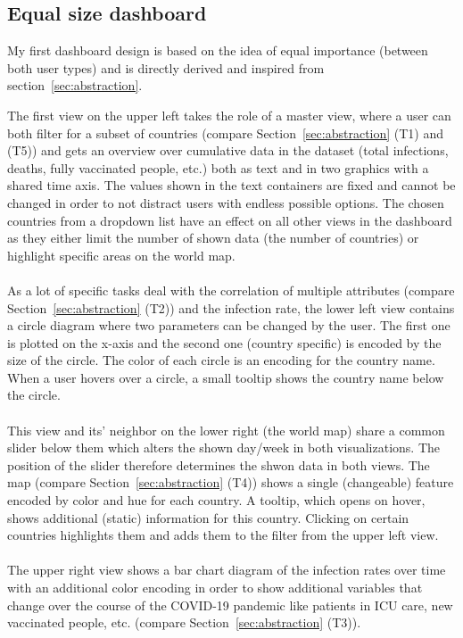 \documentclass[11pt]{article}
\begin{document}
\subsection{Equal size dashboard}
\label{sec:design1}
My first dashboard design is based on the idea of equal importance (between both user types) and is directly derived and inspired from section~\ref{sec:abstraction}. 

The first view on the upper left takes the role of a master view, where a user can both filter for a subset of countries 
(compare Section~\ref{sec:abstraction} (T1) and (T5)) and gets an overview over cumulative data 
in the dataset (total infections, deaths, fully vaccinated people, etc.) both as text and in two graphics with a shared time axis. 
The values shown in the text containers are fixed and cannot be changed in order to not distract users with endless possible options. The chosen countries from 
a dropdown list have an effect on all other views in the dashboard as they either limit the number of shown data (the number of countries) or highlight specific 
areas on the world map. 
\\\\
As a lot of specific tasks deal with the correlation of multiple attributes (compare Section~\ref{sec:abstraction} (T2)) and the infection rate, the lower 
left view contains a circle diagram where two parameters can be changed by the user. 
The first one is plotted on the x-axis and the second one (country specific) is encoded by the size of the circle. The color of each circle is an encoding for 
the country name. When a user hovers over a circle, a small tooltip shows the country name below the circle. 
\\\\
This view and its' neighbor on the lower right (the world map) share a common slider below them which alters the shown day/week in both visualizations. The 
position of the slider therefore determines the shwon data in both views. The map (compare Section~\ref{sec:abstraction} (T4)) shows a single (changeable) 
feature encoded by color and hue for each country. A tooltip, which opens on hover, shows additional (static) information for this country. 
Clicking on certain countries highlights them and adds them to the filter from the upper left view.
\\\\
The upper right view shows a bar chart diagram of the infection rates over time with an additional color encoding in order to show additional variables 
that change over the course of the COVID-19 pandemic like patients in ICU care, new vaccinated people, etc. (compare Section~\ref{sec:abstraction} (T3)).
\end{document}
